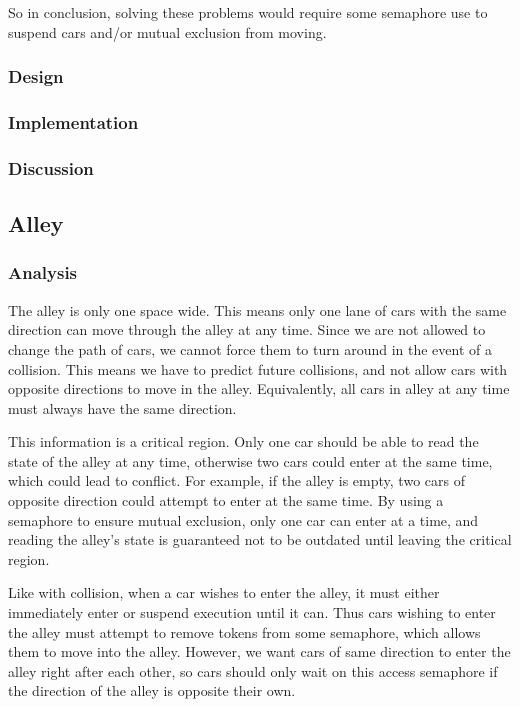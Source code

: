 So in conclusion, solving these problems would require some semaphore use to suspend cars and/or mutual exclusion from moving.

\subsubsection*{Design}

\subsubsection*{Implementation}

\subsubsection*{Discussion}


\subsection*{Alley}

\subsubsection*{Analysis}
The alley is only one space wide. This means only one lane of cars with the same direction can move through the alley at any time. Since we are not allowed to change the path of cars, we cannot force them to turn around in the event of a collision. This means we have to predict future collisions, and not allow cars with opposite directions to move in the alley. Equivalently, all cars in alley at any time must always have the same direction.

This information is a critical region. Only one car should be able to read the state of the alley at any time, otherwise two cars could enter at the same time, which could lead to conflict. For example, if the alley is empty, two cars of opposite direction could attempt to enter at the same time. By using a semaphore to ensure mutual exclusion, only one car can enter at a time, and reading the alley's state is guaranteed not to be outdated until leaving the critical region.

Like with collision, when a car wishes to enter the alley, it must either immediately enter or suspend execution until it can. Thus cars wishing to enter the alley must attempt to remove tokens from some semaphore, which allows them to move into the alley. However, we want cars of same direction to enter the alley right after each other, so cars should only wait on this access semaphore if the direction of the alley is opposite their own.

